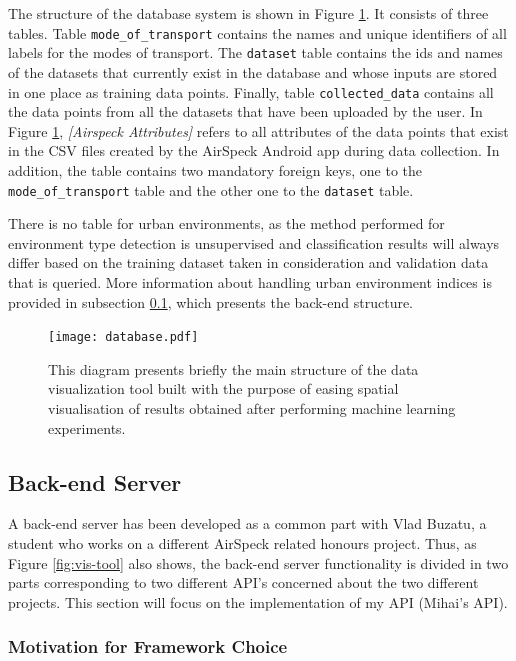 \documentclass[bsc,frontabs,twoside,singlespacing, parskip,deptreport]{infthesis}     %
\begin{document}
The structure of the database system is shown in Figure \ref{fig:database}. It consists of three tables. Table \texttt{mode\_of\_transport} contains the names and unique identifiers of all labels for the modes of transport. The \texttt{dataset} table contains the ids and names of the datasets that currently exist in the database and whose inputs are stored in one place as training data points. Finally, table \texttt{collected\_data} contains all the data points from all the datasets that have been uploaded by the user. In Figure \ref{fig:database}, \textit{[Airspeck Attributes]} refers to all attributes of the data points that exist in the CSV files created by the AirSpeck Android app during data collection. In addition, the table contains two mandatory foreign keys, one to the \texttt{mode\_of\_transport} table and the other one to the \texttt{dataset} table.

There is no table for urban environments, as the method performed for environment type detection is unsupervised and classification results will always differ based on the training dataset taken in consideration and validation data that is queried. More information about handling urban environment indices is provided in subsection \ref{subsec:back-end}, which presents the back-end structure.

\begin{figure}[h!]
  \center
  \texttt{[image: database.pdf]}
  \caption{This diagram presents briefly the main structure of the data visualization tool built with the purpose of easing spatial visualisation of results obtained after performing machine learning experiments.}
  \label{fig:database}
\end{figure}

\subsection{Back-end Server}
\label{subsec:back-end}

A back-end server has been developed as a common part with Vlad Buzatu, a student who works on a different AirSpeck related honours project. Thus, as Figure \ref{fig:vis-tool} also shows, the back-end server functionality is divided in two parts corresponding to two different API's concerned about the two different projects. This section will focus on the implementation of my API (Mihai's API).

\subsubsection*{Motivation for Framework Choice}
\end{document}
